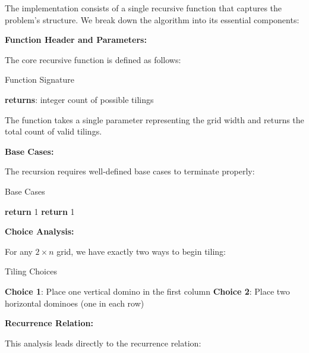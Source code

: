 \documentclass[conference]{IEEEtran}
\begin{document}
The implementation consists of a single recursive function that captures the problem's structure. We break down the algorithm into its essential components:

\textbf{Function Header and Parameters:}

The core recursive function is defined as follows:

\begin{algorithm}[htbp]
\caption{Function Signature}
\begin{algorithmic}[1]
\State \textbf{returns}: integer count of possible tilings
\EndProcedure
\end{algorithmic}
\end{algorithm}

The function takes a single parameter representing the grid width and returns the total count of valid tilings.

\textbf{Base Cases:}

The recursion requires well-defined base cases to terminate properly:

\begin{algorithm}[htbp]
\caption{Base Cases}
\begin{algorithmic}[1]
    \State \textbf{return} 1 
\EndIf
{}
    \State \textbf{return} 1 
\EndIf
\end{algorithmic}
\end{algorithm}

\textbf{Choice Analysis:}

For any $2 \times n$ grid, we have exactly two ways to begin tiling:

\begin{algorithm}[htbp]
\caption{Tiling Choices}
\begin{algorithmic}[1]
\State \textbf{Choice 1}: Place one vertical domino in the first column
\State {}
\State \textbf{Choice 2}: Place two horizontal dominoes (one in each row)
\State {}
\end{algorithmic}
\end{algorithm}

\textbf{Recurrence Relation:}

This analysis leads directly to the recurrence relation:
\end{document}
